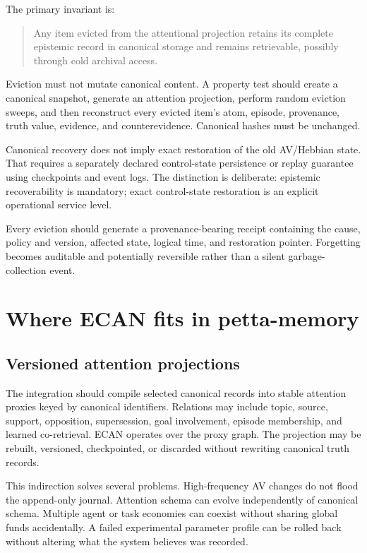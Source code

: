 \documentclass[11pt]{article}
\begin{document}
The primary invariant is:

\begin{quote}
Any item evicted from the attentional projection retains its complete epistemic
record in canonical storage and remains retrievable, possibly through cold
archival access.
\end{quote}

Eviction must not mutate canonical content.  A property test should create a
canonical snapshot, generate an attention projection, perform random eviction
sweeps, and then reconstruct every evicted item's atom, episode, provenance,
truth value, evidence, and counterevidence.  Canonical hashes must be unchanged.

Canonical recovery does not imply exact restoration of the old AV/Hebbian
state.  That requires a separately declared control-state persistence or replay
guarantee using checkpoints and event logs.  The distinction is deliberate:
epistemic recoverability is mandatory; exact control-state restoration is an
explicit operational service level.

Every eviction should generate a provenance-bearing receipt containing the
cause, policy and version, affected state, logical time, and restoration
pointer.  Forgetting becomes auditable and potentially reversible rather than
a silent garbage-collection event.

\section{Where ECAN fits in petta-memory}

\subsection{Versioned attention projections}

The integration should compile selected canonical records into stable attention
proxies keyed by canonical identifiers.  Relations may include topic, source,
support, opposition, supersession, goal involvement, episode membership, and
learned co-retrieval.  ECAN operates over the proxy graph.  The projection may
be rebuilt, versioned, checkpointed, or discarded without rewriting canonical
truth records.

This indirection solves several problems.  High-frequency AV changes do not
flood the append-only journal.  Attention schema can evolve independently of
canonical schema.  Multiple agent or task economies can coexist without
sharing global funds accidentally.  A failed experimental parameter profile
can be rolled back without altering what the system believes was recorded.
\end{document}
